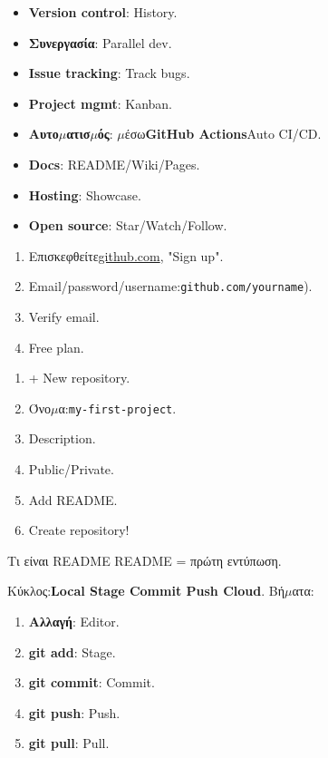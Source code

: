 \begin{itemize}
  \item \textbf{Version control}: History.
  \item \textbf{Συνεργασία}: Parallel dev.
  \item \textbf{Issue tracking}: Track bugs.
  \item \textbf{Project mgmt}: Kanban.
  \item \textbf{Αυτο$\mu$ατισ$\mu$ός}: $\mu$έσω\textbf{GitHub Actions}Auto CI/CD.
  \item \textbf{Docs}: README/Wiki/Pages.
  \item \textbf{Hosting}: Showcase.
  \item \textbf{Open source}: Star/Watch/Follow.
\end{itemize}



\begin{enumerate}
  \item Επισκεφθείτε\href{https://github.com}{github.com}, "Sign up".
  \item Email/password/username:\texttt{github.\allowbreak com/\allowbreak yourname}).
  \item Verify email.
  \item Free plan.
\end{enumerate}


\begin{enumerate}
  \item + New repository.
  \item Όνο$\mu$α:\texttt{my-\allowbreak first-\allowbreak project}.
  \item Description.
  \item Public/Private.
  \item Add README.
  \item Create repository!
\end{enumerate}

\begin{tcbinfo}{Τι είναι README}
README = πρώτη εντύπωση.

\end{tcbinfo}


Κύκλος:\textbf{Local Stage Commit Push Cloud}. Βή$\mu$ατα:

\begin{enumerate}
  \item \textbf{Αλλαγή}: Editor.
  \item \textbf{git add}: Stage.
  \item \textbf{git commit}: Commit.
  \item \textbf{git push}: Push.
  \item \textbf{git pull}: Pull.
\end{enumerate}

